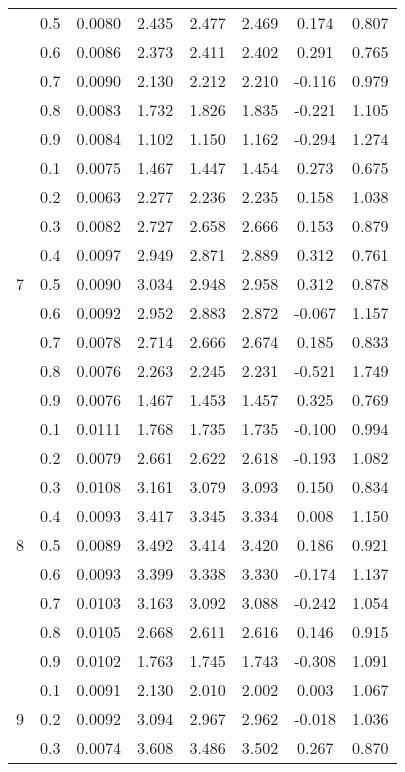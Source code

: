 \documentclass[11pt,a4paper]{report}
\begin{document}
\begin{longtable}{ | c | c || c | c | c | c | c | c | }
 & 0.5 & 0.0080 & 2.435 & 2.477 & 2.469 & 0.174 & 0.807 \\
 & 0.6 & 0.0086 & 2.373 & 2.411 & 2.402 & 0.291 & 0.765 \\
 & 0.7 & 0.0090 & 2.130 & 2.212 & 2.210 & -0.116 & 0.979 \\
 & 0.8 & 0.0083 & 1.732 & 1.826 & 1.835 & -0.221 & 1.105 \\
 & 0.9 & 0.0084 & 1.102 & 1.150 & 1.162 & -0.294 & 1.274 \\
 \hline
\multirow{9}{*}{7} & 0.1 & 0.0075 & 1.467 & 1.447 & 1.454 & 0.273 & 0.675 \\
 & 0.2 & 0.0063 & 2.277 & 2.236 & 2.235 & 0.158 & 1.038 \\
 & 0.3 & 0.0082 & 2.727 & 2.658 & 2.666 & 0.153 & 0.879 \\
 & 0.4 & 0.0097 & 2.949 & 2.871 & 2.889 & 0.312 & 0.761 \\
 & 0.5 & 0.0090 & 3.034 & 2.948 & 2.958 & 0.312 & 0.878 \\
 & 0.6 & 0.0092 & 2.952 & 2.883 & 2.872 & -0.067 & 1.157 \\
 & 0.7 & 0.0078 & 2.714 & 2.666 & 2.674 & 0.185 & 0.833 \\
 & 0.8 & 0.0076 & 2.263 & 2.245 & 2.231 & -0.521 & 1.749 \\
 & 0.9 & 0.0076 & 1.467 & 1.453 & 1.457 & 0.325 & 0.769 \\
 \hline
\multirow{9}{*}{8} & 0.1 & 0.0111 & 1.768 & 1.735 & 1.735 & -0.100 & 0.994 \\
 & 0.2 & 0.0079 & 2.661 & 2.622 & 2.618 & -0.193 & 1.082 \\
 & 0.3 & 0.0108 & 3.161 & 3.079 & 3.093 & 0.150 & 0.834 \\
 & 0.4 & 0.0093 & 3.417 & 3.345 & 3.334 & 0.008 & 1.150 \\
 & 0.5 & 0.0089 & 3.492 & 3.414 & 3.420 & 0.186 & 0.921 \\
 & 0.6 & 0.0093 & 3.399 & 3.338 & 3.330 & -0.174 & 1.137 \\
 & 0.7 & 0.0103 & 3.163 & 3.092 & 3.088 & -0.242 & 1.054 \\
 & 0.8 & 0.0105 & 2.668 & 2.611 & 2.616 & 0.146 & 0.915 \\
 & 0.9 & 0.0102 & 1.763 & 1.745 & 1.743 & -0.308 & 1.091 \\
 \hline
\multirow{9}{*}{9} & 0.1 & 0.0091 & 2.130 & 2.010 & 2.002 & 0.003 & 1.067 \\
 & 0.2 & 0.0092 & 3.094 & 2.967 & 2.962 & -0.018 & 1.036 \\
 & 0.3 & 0.0074 & 3.608 & 3.486 & 3.502 & 0.267 & 0.870 \\

\end{longtable}
\end{document}
